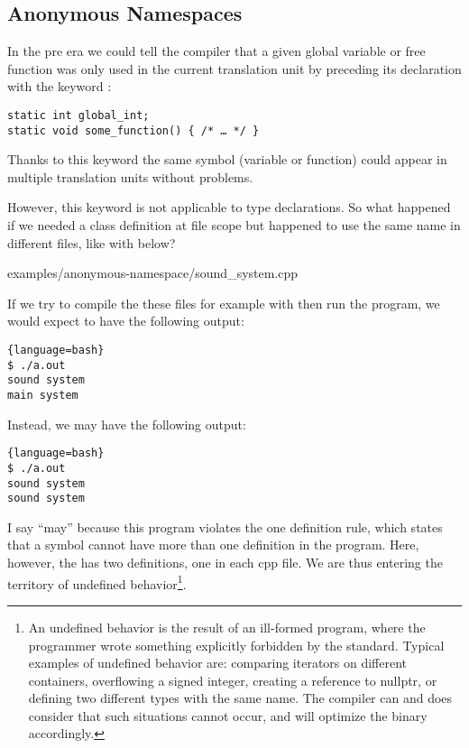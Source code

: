 \subsection{Anonymous Namespaces}

In the pre  era we could tell the compiler that a given global
variable or free function was only used in the current translation
unit by preceding its declaration with the keyword :

\begin{lstlisting}
static int global_int;
static void some_function() { /* … */ }
\end{lstlisting}

Thanks to this keyword the same symbol (variable or function) could
appear in multiple translation units without problems.

However, this keyword is not applicable to type declarations. So what
happened if we needed a class definition at file scope but happened to
use the same name in different files, like with 
below?


                {examples/anonymous-namespace/sound_system.cpp}


If we try to compile the these files for example with  then run the program, we would expect to
have the following output:

\begin{lstlisting}{language=bash}
$ ./a.out
sound system
main system
\end{lstlisting}

Instead, we may have the following output:

\begin{lstlisting}{language=bash}
$ ./a.out
sound system
sound system
\end{lstlisting}

I say ``may'' because this program violates the one definition rule,
which states that a symbol cannot have more than one definition in the
program. Here, however, the  has two definitions,
one in each cpp file. We are thus entering the territory of undefined
behavior\footnote{An undefined behavior is the result of an ill-formed
program, where the programmer wrote something explicitly forbidden by
the standard. Typical examples of undefined behavior are: comparing
iterators on different containers, overflowing a signed integer,
creating a reference to nullptr, or defining two different types with
the same name. The compiler can and does consider that such situations
cannot occur, and will optimize the binary accordingly.}.

